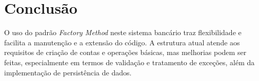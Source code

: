 \documentclass{article}
\begin{document}
\section{Conclusão}
O uso do padrão \textit{Factory Method} neste sistema bancário traz flexibilidade e facilita a manutenção e a extensão do código. A estrutura atual atende aos requisitos de criação de contas e operações básicas, mas melhorias podem ser feitas, especialmente em termos de validação e tratamento de exceções, além da implementação de persistência de dados.
\end{document}
